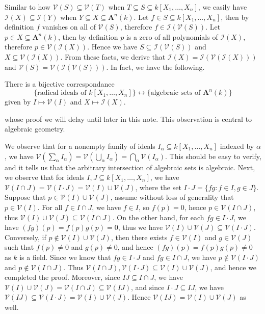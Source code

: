 \documentclass[11pt]{book}
\begin{document}
Similar to how $\mathcal{V}(S)\subseteq \mathcal{V}(T)$ when $T\subseteq S\subseteq k[X_1,\dots,X_n]$, we easily have $\mathcal{I}(X)\subseteq \mathcal{I}(Y)$ when $Y\subseteq X\subseteq \mathbf A^n(k)$. Let $f\in S\subseteq k[X_1,\dots,X_n]$, then by definition $f$ vanishes on all of $\mathcal{V}(S)$, therefore $f\in \mathcal{I}(\mathcal{V}(S))$. Let $p\in X\subseteq \mathbf A^n(k)$, then by definition $p$ is a zero of all polynomials of $\mathcal{I}(X)$, therefore $p\in \mathcal{V}(\mathcal{I}(X))$. Hence we have $S\subseteq \mathcal{I}(\mathcal{V}(S))$ and $X\subseteq \mathcal{V}(\mathcal{I}(X))$. From these facts, we derive that $\mathcal{I}(X)= \mathcal{I}(\mathcal{V}(\mathcal{I}(X)))$ and $\mathcal{V}(S)= \mathcal{V}(\mathcal{I}(\mathcal V(S)))$. In fact, we have the following.
\begin{theorembox}There is a bijective correspondance
\[\{\textrm{radical\ ideals\ of\ }k[X_1,\dots,X_n]\}\longleftrightarrow\{\textrm{algebraic\ sets\ of\ }\mathbf A^n(k)\}\]
given by $I\mapsto \mathcal{V}(I)$ and $X\mapsto \mathcal{I}(X)$.
\end{theorembox}
whose proof we will delay until later in this note. This observation is central to algebraic geometry. 

We observe that for a nonempty family of ideals $I_{\alpha}\subseteq k[X_1,\dots,X_n]$ indexed by $\alpha$, we have $\mathcal{V}(\sum_{\alpha}I_{\alpha})=\mathcal{V}(\bigcup_{\alpha}I_{\alpha})=\bigcap_{\alpha}\mathcal{V}(I_{\alpha})$. This should be easy to verify, and it tells us that the arbitrary intersection of algebraic sets is algebraic. Next, we observe that for ideals $I,J\subseteq k[X_1,\dots,X_n]$, we have $\mathcal{V}(I\cap J)=\mathcal{V}(I\cdot J)=\mathcal{V}(I)\cup \mathcal{V}(J)$, where the set $I\cdot J=\{fg:f\in I,g\in J\}$. Suppose that $p\in \mathcal{V}(I)\cup \mathcal{V}(J)$, assume without loss of generality that $p\in \mathcal{V}(I)$. For all $f\in I\cap J$, we have $f\in I$, so $f(p)=0$, hence $p\in \mathcal{V}(I\cap J)$, thus $\mathcal{V}(I)\cup\mathcal{V}(J)\subseteq \mathcal{V}(I\cap J)$. On the other hand, for each $fg\in I\cdot J$, we have $(fg)(p)=f(p)g(p)=0$, thus we have $\mathcal{V}(I)\cup\mathcal{V}(J)\subseteq \mathcal{V}(I\cdot J)$. Conversely, if $p\not\in \mathcal{V}(I)\cup \mathcal{V}(J)$, then there exists $f\in \mathcal{V}(I)$ and $g\in \mathcal{V}(J)$ such that $f(p)\ne 0$ and $g(p)\ne 0$, and hence $(fg)(p)=f(p)g(p)\ne 0$ as $k$ is a field. Since we know that $fg\in I\cdot J$ and $fg\in I\cap J$, we have $p\not\in \mathcal{V}(I\cdot J)$ and $p\not\in \mathcal{V}(I\cap J)$. Thus $\mathcal{V}(I\cap J),\mathcal{V}(I\cdot J)\subseteq \mathcal{V}(I)\cup\mathcal{V}(J)$, and hence we completed the proof. Moreover, since $IJ\subseteq I\cap J$, we have $\mathcal{V}(I)\cup\mathcal{V}(J)=\mathcal{V}(I\cap J)\subseteq\mathcal{V}(IJ)$, and since $I\cdot J\subseteq IJ$, we have $\mathcal{V}(IJ)\subseteq\mathcal{V}(I\cdot J)=\mathcal{V}(I)\cup\mathcal{V}(J)$. Hence $\mathcal{V}(IJ)=\mathcal{V}(I)\cup\mathcal{V}(J)$ as well.
\end{document}
